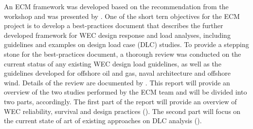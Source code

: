 An ECM framework was developed based on the recommendation from the workshop and was presented by \cite{Yu2015}. One of the short tern objectives for the ECM project is to develop a best-practices document that describes the further developed framework for WEC design response and load analyses, including guidelines and examples on design load case (DLC) studies. 
To provide a stepping stone for the best-practices document, a thorough review was conducted on the current status of any existing WEC design load guidelines, as well as the guidelines developed for offshore oil and gas, naval architecture and offshore wind. Details of the review are documented by \cite{Coe2017, VanRij2018}. This report will provide an overview of the two studies performed by the ECM team and will be divided into two parts, accordingly. The first part of the report will provide an overview of WEC reliability, survival and design practices (\cite{Coe2017}). The second part will focus on the current state of art of existing approaches on DLC analysis (\cite{VanRij2018}).